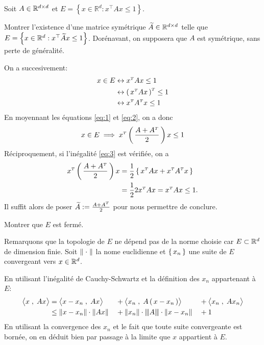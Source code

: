 \begin{chap}
\begin{exo}
Soit $A \in \mathbb{R}^{d\times d}$ et $E = \left\{ x \in \mathbb { R } ^ { d } : x ^ { \top } A x \leq 1 \right\}$.
\end{exo}

\begin{qst}
  Montrer l'existence d'une matrice symétrique $\widetilde{A} \in \mathbb{R}^{d\times d}$ telle que
  $E = \left\{ x \in \mathbb { R } ^ { d } : x ^ { \top } \widetilde{A} x \leq 1 \right\}$.
  Dorénavant, on supposera que $A$ est symétrique, sans perte de généralité.
\end{qst}

\begin{rep}
On a succesivement:
\begin{align}
  x \in E &\leftrightarrow x^{\scriptscriptstyle T}Ax \leq 1 \label{eq:1} \\
&\leftrightarrow \left( \, x^{\scriptscriptstyle T}Ax \, \right)^{\scriptscriptstyle T} \leq 1 \nonumber\\
&\leftrightarrow x^{\scriptscriptstyle T}A^{\scriptscriptstyle T}x \leq 1 \label{eq:2}
\end{align}
En moyennant les équations \eqref{eq:1} et \eqref{eq:2}, on a donc
\begin{equation}\label{eq:3}
  x \in E \implies x^{\scriptscriptstyle T}\left( \, \frac{A+A^{\scriptscriptstyle T}}{2} \, \right)x \leq 1
\end{equation}
Réciproquement, si l'inégalité \eqref{eq:3} est vérifiée, on a
\begin{align*}
  x^{\scriptscriptstyle T}\left( \, \frac{A+A^{\scriptscriptstyle T}}{2} \, \right)x &= \frac{1}{2} \left \{ \, 
  x^{\scriptscriptstyle T}Ax+x^{\scriptscriptstyle T}A^{\scriptscriptstyle T}x
   \, \right \} \\
  &= \frac{1}{2} 2 x^{\scriptscriptstyle T}Ax = x^{\scriptscriptstyle T}Ax \leq 1.
\end{align*}
Il suffit alors de poser $\widetilde{A} := \frac{A+A^{\scriptscriptstyle T}}{2}$ pour nous permettre
 de conclure.
\end{rep}


\begin{qst}
Montrer que $E$ est fermé.
\end{qst}

\begin{rep}
Remarquons que la topologie de $E$ ne dépend pas de la norme choisie car $E \subset \mathbb{R}^d$
 de dimension finie. Soit $\norme{\;\cdot \;}$ la nome euclidienne et $\left \{ \, x_n \, \right \}$
 une suite de $E$ convergeant vers $x \in \mathbb{R}^d$.

 En utilisant l'inégalité de Cauchy-Schwartz et la définition des $x_n$ appartenant
  à $E$:
 \begin{alignat*}{3}
\bigps{x}{Ax} &= \bigps{x-x_n}{Ax} &&+ \bigps{x_n}{A\prt{x-x_n}} &&+\bigps{x_n}{Ax_n}\\
&\leq \norme{x-x_n}\cdot \norme{Ax} &&+ \norme{x_n} \cdot \normetriple{A} \cdot \norme{x-x_n} &&+1\\
\end{alignat*}
En utilisant la convergence des $x_n$ et le fait que toute suite convergeante est bornée, on en déduit bien par passage à la limite que $x$ appartient à $E$. 
\end{rep}

\end{chap}
